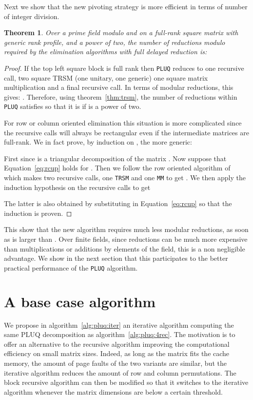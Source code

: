 \documentclass{article}
\newcommand{\customvspace}[1]{}
\newcommand{\pluq}{\texttt{PLUQ}\xspace}
\newcommand{\trsm}{\texttt{TRSM}\xspace}
\newcommand{\MM}{\texttt{MM}\xspace}
\newtheorem{theorem}{Theorem}
\begin{document}
Next we show that the new pivoting strategy is more efficient in terms
of number of integer division. 
\begin{theorem} Over a prime field modulo  and on a full-rank
  square  matrix with generic rank profile, and  a power
  of two, the number of reductions modulo  required by the
 elimination algorithms with full delayed reduction is:
\customvspace{-5pt}

\customvspace{-10pt}
\end{theorem}
\begin{proof}
If the top left square block is full rank then \pluq reduces to
  one recursive call, two square TRSM (one unitary, one generic) one
  square matrix multiplication and a final recursive call. In terms of modular reductions, this gives: 
.
Therefore, using theorem~\ref{thm:trsm}, the number of reductions
within \pluq satisfies  so that
it is  if  is a power of two.

For row or column oriented elimination this situation is more
  complicated since the recursive calls will always be
  rectangular even if the intermediate matrices are full-rank.
We in fact prove, by induction on , the more generic:

First  since  is a triangular decomposition of the  matrix .
Now suppose that Equation~\ref{eq:rcup} holds for .
Then we follow the row oriented algorithm of \cite[Lemma 5.1]{jgd:2008:toms} which makes two recursive calls, one \trsm and one \MM to get  . 
We then apply the induction hypothesis on the recursive calls to get

The latter is also obtained by substituting  in Equation~\ref{eq:rcup} so that the induction is proven.
\customvspace{-15pt}\end{proof}

This show that the new algorithm requires much less modular reductions, as soon
as  is larger than . Over finite fields, since reductions can be much
more expensive than multiplications or additions by elements of the field, this
is a non negligible advantage. We show in the next section that this
participates to the better practical performance of the \pluq algorithm.
 \section{A base case  algorithm}\label{sec:base}

We propose in algorithm~\ref{alg:pluq:iter} an iterative algorithm computing the same PLUQ decomposition as
algorithm~\ref{alg:pluq:4rec}. 
The motivation is to offer an alternative to the recursive algorithm 
improving the computational efficiency on small matrix sizes. 
Indeed, as long as the matrix fits the cache memory, the amount of
page faults of the two variants are similar, but the iterative
algorithm reduces the amount of row and column permutations.
The block recursive algorithm can then be modified so that it switches to the
iterative algorithm whenever the matrix dimensions are below a certain
threshold.
\end{document}
